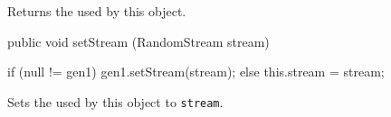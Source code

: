   \begin{tabb}  Returns the  used by this object.
 \end{tabb}
\begin{htmlonly}
\end{htmlonly}
\begin{code}

   public void setStream (RandomStream stream)\begin{hide} {
      if (null != gen1)
         gen1.setStream(stream);
      else
         this.stream = stream;
   }\end{hide}
\end{code}
\begin{tabb}
   Sets the  used by this object to \texttt{stream}.
\end{tabb}

\begin{code}\begin{hide}
}\end{hide}
\end{code}
